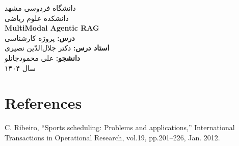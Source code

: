 \documentclass[12pt,a4paper]{article}
\newcommand{\LTRSection}[1]{%
    \LTR\section{\textsf{#1}}
}
\begin{document}
\thispagestyle{empty}
\begin{center}
    \vspace*{2cm}
    \Huge{دانشگاه فردوسی مشهد} \\[0.5cm]
    \Large{دانشکده علوم ریاضی} \\[2cm]
    \Huge{\LTR\textbf{MultiModal Agentic RAG}} \\[2cm]
    \Large{
        \textbf{درس:} پروژه کارشناسی \\
        \textbf{استاد درس:} دکتر جلال‌الدّین نصیری
    } \\[2cm]
    \Large{
        \textbf{دانشجو:} علی محمودجانلو
    } \\[3cm]
    \Large{سال ۱۴۰۴}
\end{center}

\newpage

\thispagestyle{empty}
\hypersetup{linkcolor=blue}
\tableofcontents
\newpage




\newpage
\LTRSection{References}
\begin{thebibliography}{10}
     C. Ribeiro, “Sports scheduling: Problems and applications,” International Transactions in Operational Research, vol.19, pp.201–226, Jan. 2012.
\end{thebibliography}
\end{document}

